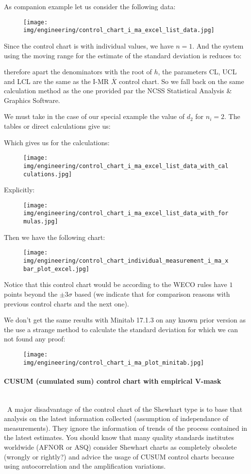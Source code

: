 	As companion example let us consider the following data:
	\begin{figure}[H]
		\centering
		\texttt{[image: img/engineering/control\_chart\_i\_ma\_excel\_list\_data.jpg]}
	\end{figure}
	Since the control chart is with individual values, we have $n=1$. And the system using the moving range for the estimate of the standard deviation is reduces to:
	
	therefore apart the denominators with the root of $h$, the parameters CL, UCL and LCL are the same as the I-MR $\overline{X}$ control chart. So we fall back on the same calculation method as the one provided par the NCSS Statistical Analysis \& Graphics Software.
	
	We must take in the case of our special example the value of $d_2$ for $n_i=2$. The tables or direct calculations give us:
	
	Which gives us for the calculations:
	\begin{figure}[H]
		\centering
		\texttt{[image: img/engineering/control\_chart\_i\_ma\_excel\_list\_data\_with\_calculations.jpg]}
	\end{figure}
	Explicitly:
	\begin{figure}[H]
		\centering
		\texttt{[image: img/engineering/control\_chart\_i\_ma\_excel\_list\_data\_with\_formulas.jpg]}
	\end{figure}
	Then we have the following chart:
	\begin{figure}[H]
		\centering
		\texttt{[image: img/engineering/control\_chart\_individual\_measurement\_i\_ma\_xbar\_plot\_excel.jpg]}
	\end{figure}
	Notice that this control chart would be according to the WECO rules have $1$ points beyond the $\pm 3\sigma$ based (we indicate that for comparison reasons with previous control charts and the next one).
	
	We don't get the same results with Minitab 17.1.3 on any known prior version as the use a strange method to calculate the standard deviation for which we can not found any proof:
	\begin{figure}[H]
		\centering
		\texttt{[image: img/engineering/control\_chart\_i\_ma\_plot\_minitab.jpg]}
	\end{figure}
	
	\paragraph{CUSUM (cumulated sum) control chart with empirical V-mask}\mbox{}\\\
	A major disadvantage of the control chart of the Shewhart type is to base that analysis on the latest information collected (assumption of independance of measurements). They ignore the information of trends of the process contained in the latest estimates. You should know that many quality standards institutes worldwide (AFNOR or ASQ) consider Shewhart charts as completely obsolete (wrongly or rightly?) and advice the usage of CUSUM control charts because using autocorrelation and the amplification variations.

